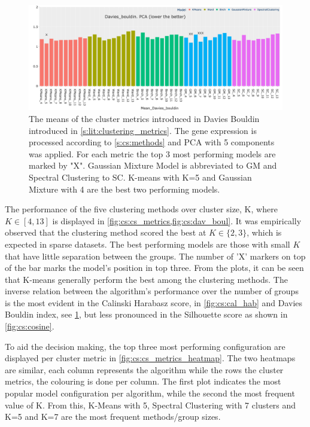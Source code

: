 \begin{figure}[!htb]    
    \centering
    \includegraphics[width=1.0\textwidth,keepaspectratio]{Sections/ClusteringAnalysis/Resources/cs_top3/PCA_top3_Davies_bouldin.png}
    \caption[Measuring clustering models: Davies Boulding]{The means of the cluster metrics introduced in Davies Bouldin introduced in \cref{s:lit:clustering_metrics}. The gene expression is processed according to \cref{s:cs:methods} and PCA with 5 components was applied. For each metric the top 3 most performing models are marked by "X". Gaussian Mixture Model is abbreviated to GM and Spectral Clustering to SC. K-means with K=5 and Gaussian Mixture with 4 are the best two performing models.}
    \label{fig:cs:dav_boul}
\end{figure}

The performance of the five clustering methods over cluster size, K, where $K\in[4, 13]$ is displayed in \cref{fig:cs:cs_metrics,fig:cs:dav_boul}. It was empirically observed that the clustering method scored the best at $K\in\{2,3\}$, which is expected in sparse datasets. The best performing models are those with small $K$ that have little separation between the groups. The number of 'X' markers on top of the bar marks the model's position in top three. From the plots, it can be seen that K-means generally perform the best among the clustering methods. The inverse relation between the algorithm's performance over the number of groups is the most evident in the Calinski Harabasz score, in \cref{fig:cs:cal_hab} and Davies Bouldin index, see \cref{fig:cs:dav_boul}, but less pronounced in the Silhouette score as shown in \cref{fig:cs:cosine}.


To aid the decision making, the top three most performing configuration are displayed per cluster metric in \cref{fig:cs:cs_metrics_heatmap}. The two heatmaps are similar, each column represents the algorithm while the rows the cluster metrics, the colouring is done per column. The first plot indicates the most popular model configuration per algorithm, while the second the most frequent value of K. From this, K-Means with 5, Spectral Clustering with 7 clusters and K=5 and K=7 are the most frequent methods/group sizes. 

